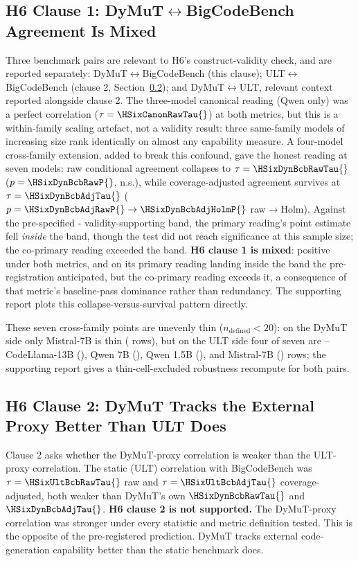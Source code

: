 \subsection{H6 Clause 1: DyMuT$\leftrightarrow$BigCodeBench Agreement Is Mixed}
\label{sec:results-h6clause1}
Three benchmark pairs are relevant to H6's construct-validity check, and are reported separately: DyMuT$\leftrightarrow$BigCodeBench (this clause); ULT$\leftrightarrow$BigCodeBench (clause 2, Section~\ref{sec:results-h6clause2}); and DyMuT$\leftrightarrow$ULT, relevant context reported alongside clause 2. The three-model canonical reading (Qwen only) was a perfect correlation ($\tau=\HSixCanonRawTau{}$) at both metrics, but this is a within-family scaling artefact, not a validity result: three same-family models of increasing size rank identically on almost any capability measure. A four-model cross-family extension, added to break this confound, gave the honest reading at seven models: raw conditional agreement collapses to $\tau=\HSixDynBcbRawTau{}$ ($p=\HSixDynBcbRawP{}$, n.s.), while coverage-adjusted agreement survives at $\tau=\HSixDynBcbAdjTau{}$ ($p=\HSixDynBcbAdjRawP{}\rightarrow\HSixDynBcbAdjHolmP{}$ raw$\rightarrow$Holm). Against the pre-specified \HSixBandLow{}-\HSixBandHigh{} validity-supporting band, the primary reading's point estimate fell \emph{inside} the band, though the test did not reach significance at this sample size; the co-primary reading exceeded the band. \textbf{H6 clause 1 is mixed}: positive under both metrics, and on its primary reading landing inside the band the pre-registration anticipated, but the co-primary reading exceeds it, a consequence of that metric's baseline-pass dominance rather than redundancy. The supporting report plots this collapse-versus-survival pattern directly.

These seven cross-family points are unevenly thin ($n_{\text{defined}}{<}20$): on the DyMuT side only Mistral-7B is thin (\HSixMistralDynNDefined{} rows), but on the ULT side four of seven are -- CodeLlama-13B (\HSixCodeLlamaUltNDefined{}), Qwen 7B (\HSixQwenSevenBUltNDefined{}), Qwen 1.5B (\HSixQwenOneFiveBUltNDefined{}), and Mistral-7B (\HSixMistralUltNDefined{}) rows; the supporting report gives a thin-cell-excluded robustness recompute for both pairs. %

\subsection{H6 Clause 2: DyMuT Tracks the External Proxy Better Than ULT Does}
\label{sec:results-h6clause2}
Clause 2 asks whether the DyMuT-proxy correlation is weaker than the ULT-proxy correlation. The static (ULT) correlation with BigCodeBench was $\tau=\HSixUltBcbRawTau{}$ raw and $\tau=\HSixUltBcbAdjTau{}$ coverage-adjusted, both weaker than DyMuT's own $\HSixDynBcbRawTau{}$ and $\HSixDynBcbAdjTau{}$. \textbf{H6 clause 2 is not supported.} The DyMuT-proxy correlation was stronger under every statistic and metric definition tested. This is the opposite of the pre-registered prediction. DyMuT tracks external code-generation capability better than the static benchmark does.

